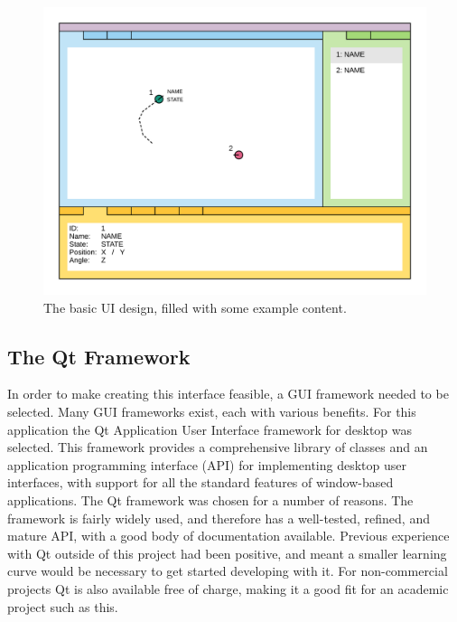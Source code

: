 \begin{figure}
	\centering
	\includegraphics[scale=1]{Figures/UIExample.png}
	\decoRule
	\caption[UI Example]{The basic UI design, filled with some example content.}
	\label{fig:UIExample}
\end{figure}

\subsection{The Qt Framework}
In order to make creating this interface feasible, a GUI framework needed to be selected. Many GUI frameworks exist, each with various benefits. For this application the Qt Application User Interface framework for desktop was selected. This framework provides a comprehensive library of classes and an application programming interface (API) for implementing desktop user interfaces, with support for all the standard features of window-based applications. The Qt framework was chosen for a number of reasons. The framework is fairly widely used, and therefore has a well-tested, refined, and mature API, with a good body of documentation available. Previous experience with Qt outside of this project had been positive, and meant a smaller learning curve would be necessary to get started developing with it. For non-commercial projects Qt is also available free of charge, making it a good fit for an academic project such as this.

